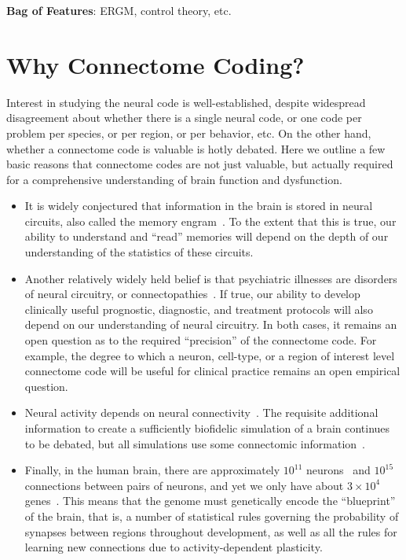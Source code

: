 \documentclass[11pt]{article}
\begin{document}
    
    \textbf{Bag of Features}: ERGM, control theory, etc.




\section{Why Connectome Coding?}

Interest in studying the  neural code is well-established, despite widespread disagreement about whether there is a single neural code, or one code per problem per species, or per region, or per behavior, etc.  
On the other hand, whether a connectome code is valuable is hotly debated.  Here we outline a few basic reasons that connectome codes are not just valuable, but actually required for a comprehensive understanding of brain function and dysfunction.  
% 
\begin{itemize}
\item It is widely conjectured that information in the brain is stored in neural circuits, also called the memory engram~\cite{Strength2003-yq}. To the extent that this is true, our ability to understand and ``read'' memories will depend on the depth of our understanding of the statistics of these circuits.  
% 
\item Another relatively widely held belief is that psychiatric illnesses are disorders of neural circuitry, or connectopathies~\cite{Castellanos2013-xq, Van_Dam2017-cv, Spronk2018-ph, Elliott2018-bj, Powell2018-ad, Braun2018-cg}. If true, our ability to develop clinically useful prognostic, diagnostic, and treatment protocols will also depend on our understanding of neural circuitry.  In both cases, it remains an open question as to the required ``precision'' of the connectome code.  For example, the degree to which a  neuron,  cell-type, or a region of interest level connectome code will be useful for clinical practice remains an open empirical question.
% 
\item  Neural activity depends on  neural connectivity~\cite{Mill2017-aa}.  The requisite additional information to create a sufficiently biofidelic simulation of a brain continues to be debated,  but all simulations use some connectomic information~\cite{Markram2015-fs}.
\item Finally, in the human brain, there are approximately $10^{11}$ neurons~\cite{Herculano-Houzel2009-zv} and $10^{15}$ connections between pairs of neurons, and yet we only have about $3 \times 10^4$ genes~\cite{Ezkurdia2014-ta}.  This means that the genome must genetically encode the ``blueprint'' of the brain, that is, a number of statistical rules governing the probability of synapses between regions throughout development, as well as all the rules for learning new connections due to activity-dependent plasticity.  
\end{itemize}
\end{document}
